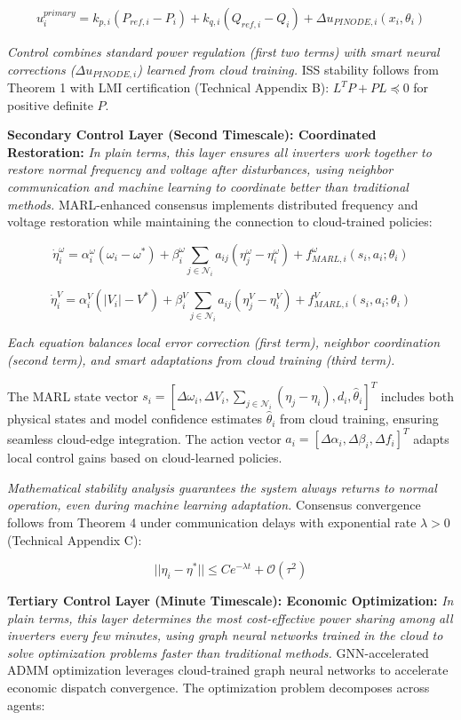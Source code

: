 \documentclass[12pt]{article}
\begin{document}
$$u_i^{primary} = k_{p,i}(P_{ref,i} - P_i) + k_{q,i}(Q_{ref,i} - Q_i) + \Delta u_{PINODE,i}(x_i, \theta_i)$$

\textit{Control combines standard power regulation (first two terms) with smart neural corrections ($\Delta u_{PINODE,i}$) learned from cloud training.} ISS stability follows from Theorem 1 with LMI certification (Technical Appendix B): $L^T P + PL \preceq 0$ for positive definite $P$.

\textbf{Secondary Control Layer (Second Timescale): Coordinated Restoration:} \textit{In plain terms, this layer ensures all inverters work together to restore normal frequency and voltage after disturbances, using neighbor communication and machine learning to coordinate better than traditional methods.} MARL-enhanced consensus implements distributed frequency and voltage restoration while maintaining the connection to cloud-trained policies:

$$\dot{\eta}_i^{\omega} = \alpha_i^{\omega}(\omega_i - \omega^*) + \beta_i^{\omega} \sum_{j \in \mathcal{N}_i} a_{ij}(\eta_j^{\omega} - \eta_i^{\omega}) + f_{MARL,i}^{\omega}(s_i, a_i; \theta_i)$$

$$\dot{\eta}_i^{V} = \alpha_i^{V}(|V_i| - V^*) + \beta_i^{V} \sum_{j \in \mathcal{N}_i} a_{ij}(\eta_j^{V} - \eta_i^{V}) + f_{MARL,i}^{V}(s_i, a_i; \theta_i)$$

\textit{Each equation balances local error correction (first term), neighbor coordination (second term), and smart adaptations from cloud training (third term).}

The MARL state vector $s_i = [\Delta\omega_i, \Delta V_i, \sum_{j \in \mathcal{N}_i}(\eta_j - \eta_i), d_i, \hat{\theta}_i]^T$ includes both physical states and model confidence estimates $\hat{\theta}_i$ from cloud training, ensuring seamless cloud-edge integration. The action vector $a_i = [\Delta\alpha_i, \Delta\beta_i, \Delta f_i]^T$ adapts local control gains based on cloud-learned policies.

\textit{Mathematical stability analysis guarantees the system always returns to normal operation, even during machine learning adaptation.} Consensus convergence follows from Theorem 4 under communication delays with exponential rate $\lambda > 0$ (Technical Appendix C):

$$||\eta_i - \eta^*|| \leq Ce^{-\lambda t} + \mathcal{O}(\tau^2)$$

\textbf{Tertiary Control Layer (Minute Timescale): Economic Optimization:} \textit{In plain terms, this layer determines the most cost-effective power sharing among all inverters every few minutes, using graph neural networks trained in the cloud to solve optimization problems faster than traditional methods.} GNN-accelerated ADMM optimization leverages cloud-trained graph neural networks to accelerate economic dispatch convergence. The optimization problem decomposes across agents:
\end{document}
